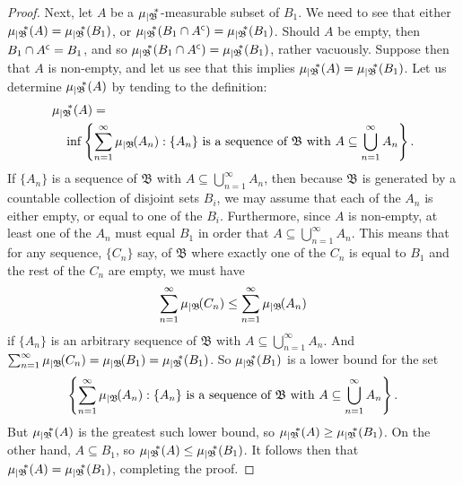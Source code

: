 \documentclass[
twoside=true,
paper=letter,
fontsize=11pt,
pagesize=auto,
leqno,
openany,
headsepline,
overfullrule,
]{scrbook}
\theoremstyle{plain}
\theoremstyle{plain}
\theoremstyle{definition}
\theoremstyle{bfnoteitalic}
\theoremstyle{bfnoteroman}
\newcommand{\sigalg}[1]{\mathfrak{#1}}
\newcommand{\restrictedto}[1]{_{\lvert#1}\kern-1.5pt}
\newcommand{\comp}{^{\hbox{\tiny{$\mathsf C$}}}}
\newcommand{\meets}{\cap}
\newcommand{\sigmaalgebraii}{\sigalg{B}}
\newcommand{\Psubstar}[1]{\measure\restrictedto{#1}\kern-2pt^*}
\newcommand{\sigalgb}{\sigmaalgebraii}
\newcommand{\measure}{\mu}
\begin{document}
\begin{proof}
Next, let $A$ be a $\Psubstar{\sigalgb}$-measurable subset of $B_1$. We need to see that either $\Psubstar{\sigalgb}(A) = \Psubstar{\sigalgb}(B_1)$,
or 
$\Psubstar{\sigalgb}(B_1\meets A\comp) = \Psubstar{\sigalgb}(B_1)$. Should $A$ be empty, then $B_1\meets A\comp = B_1$, and so 
$\Psubstar{\sigalgb}(B_1\meets A\comp) = \Psubstar{\sigalgb}(B_1)$, rather vacuously.
Suppose then that $A$ is non-empty, and let us see that this implies 
$\Psubstar{\sigalgb}(A) = \Psubstar{\sigalgb}(B_1)$.
Let us determine $\Psubstar{\sigalgb}(A)$ by tending to the definition:
\begin{align*}
& \Psubstar{\sigalgb}(A) = \\
& \quad \inf \left\{
\sum_{n=1}^{\infty}
\measure\restrictedto{\sigalgb}(A_n) : 
\text{$\{A_n\}$ is a sequence of $\sigalgb$ with $A\subseteq\bigcup_{n=1}^{\infty} A_n$}
\right\}.
\end{align*}
If $\{A_n\}$ is a sequence of $\sigalgb$ with $A\subseteq\bigcup_{n=1}^{\infty} A_n$, then because $\sigalgb$ is generated by a countable collection of disjoint sets $B_i$, we may assume that each of the $A_n$ is either empty, or equal to one of the $B_i$. Furthermore, since $A$ is non-empty, at least one of the $A_n$ must equal $B_1$ in order that $A\subseteq\bigcup_{n=1}^{\infty} A_n$. This means that for any sequence, $\{C_n\}$ say, of $\sigalgb$ where exactly one of the $C_n$ is equal to $B_1$ and the rest of the $C_n$ are empty, we must have 
\[
\sum_{n=1}^{\infty}
\measure\restrictedto{\sigalgb}(C_n)
\leq 
\sum_{n=1}^{\infty}
\measure\restrictedto{\sigalgb}(A_n)
\]
if $\{A_n\}$ is an arbitrary sequence of $\sigalgb$ with $A\subseteq\bigcup_{n=1}^{\infty} A_n$. And
$\sum_{n=1}^{\infty}
\measure\restrictedto{\sigalgb}(C_n) 
=\measure\restrictedto{\sigalgb}(B_1) 
= \Psubstar{\sigalgb}(B_1)$. So
$\Psubstar{\sigalgb}(B_1)$ is a lower bound for the set
\[
\left\{
\sum_{n=1}^{\infty}
\measure\restrictedto{\sigalgb}(A_n) : 
\text{$\{A_n\}$ is a sequence of $\sigalgb$ with $A\subseteq\bigcup_{n=1}^{\infty} A_n$}
\right\}.
\]
But $\Psubstar{\sigalgb}(A)$ is the greatest such lower bound, so 
$\Psubstar{\sigalgb}(A) 
\geq 
\Psubstar{\sigalgb}(B_1)$.
On the other hand, $A\subseteq B_1$, so $\Psubstar{\sigalgb}(A) 
\leq 
\Psubstar{\sigalgb}(B_1)$.
It follows then that $\Psubstar{\sigalgb}(A) 
= 
\Psubstar{\sigalgb}(B_1)$, completing the proof.
\end{proof}
\end{document}
